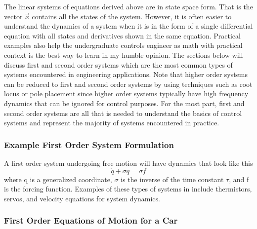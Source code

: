 The linear systems of equations derived above are in state space form. That is the vector $\vec{x}$ contains all the states of the system. However, it is often easier to understand the dynamics of a system when it is in the form of a single differential equation with all states and derivatives shown in the same equation. Practical examples also help the undergraduate controls engineer as math with practical context is the best way to learn in my humble opinion. The sections below will discuss first and second order systems which are the most common types of systems encountered in engineering applications. Note that higher order systems can be reduced to first and second order systems by using techniques such as root locus or pole placement since higher order systems typically have high frequency dynamics that can be ignored for control purposes. For the most part, first and second order systems are all that is needed to understand the basics of control systems and represent the majority of systems encountered in practice.

\subsubsection{Example First Order System Formulation}

A first order system undergoing free motion will have dynamics that look like this
\begin{equation} \label{e:first_order}
\dot{q} + \sigma q = \sigma f
\end{equation}
\noindent where q is a generalized coordinate, $\sigma$ is the inverse of the time constant $\tau$, and f is the forcing function. Examples of these types of systems in include thermistors, servos, and velocity equations for system dynamics. 

\subsubsection{First Order Equations of Motion for a Car}

